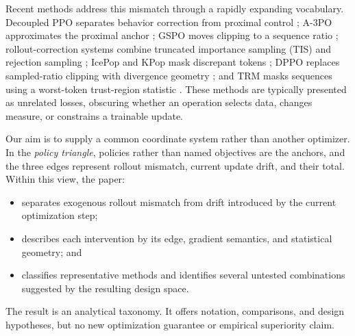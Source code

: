 \documentclass[10pt,twocolumn]{article}
\begin{document}
Recent methods address this mismatch through a rapidly expanding vocabulary.  Decoupled PPO separates behavior correction from proximal control \citep{hilton2022batch}; A-3PO approximates the proximal anchor \citep{li2025a3po}; GSPO moves clipping to a sequence ratio \citep{zheng2025gspo}; rollout-correction systems combine truncated importance sampling (TIS) and rejection sampling \citep{verl2026rolloutcorr}; IcePop and KPop mask discrepant tokens \citep{lingteam2025ring1t,kpop2026}; DPPO replaces sampled-ratio clipping with divergence geometry \citep{qi2026dppo}; and TRM masks sequences using a worst-token trust-region statistic \citep{li2025trm}.  These methods are typically presented as unrelated losses, obscuring whether an operation selects data, changes measure, or constrains a trainable update.

Our aim is to supply a common coordinate system rather than another optimizer.  In the \emph{policy triangle}, policies rather than named objectives are the anchors, and the three edges represent rollout mismatch, current update drift, and their total.  Within this view, the paper:
\begin{itemize}[leftmargin=*]
    \item separates exogenous rollout mismatch from drift introduced by the current optimization step;
    \item describes each intervention by its edge, gradient semantics, and statistical geometry; and
    \item classifies representative methods and identifies several untested combinations suggested by the resulting design space.
\end{itemize}
The result is an analytical taxonomy.  It offers notation, comparisons, and design hypotheses, but no new optimization guarantee or empirical superiority claim.
\end{document}
